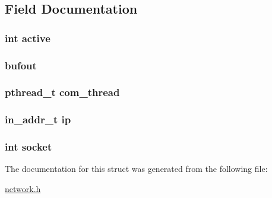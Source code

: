 \subsection{Field Documentation}
\hypertarget{structpeer_aa5805c5e936174e5092bf7a5b78e7e64}{
\subsubsection[{active}]{\setlength{\rightskip}{0pt plus 5cm}int active}}\label{structpeer_aa5805c5e936174e5092bf7a5b78e7e64}
\hypertarget{structpeer_a78b709e715ca837e65e67e5239799998}{
\subsubsection[{bufout}]{ bufout}}\label{structpeer_a78b709e715ca837e65e67e5239799998}
\hypertarget{structpeer_a9e2ccb9eb99322d3c6d4e025d1a46f53}{
\subsubsection[{com\-\_\-thread}]{\setlength{\rightskip}{0pt plus 5cm}pthread\-\_\-t com\-\_\-thread}}\label{structpeer_a9e2ccb9eb99322d3c6d4e025d1a46f53}
\hypertarget{structpeer_a576f19065d49f151479e4fd2df18670b}{
\subsubsection[{ip}]{\setlength{\rightskip}{0pt plus 5cm}in\-\_\-addr\-\_\-t ip}}\label{structpeer_a576f19065d49f151479e4fd2df18670b}
\hypertarget{structpeer_a3666576f6b88007cc7b8f26c7da596c8}{
\subsubsection[{socket}]{\setlength{\rightskip}{0pt plus 5cm}int socket}}\label{structpeer_a3666576f6b88007cc7b8f26c7da596c8}


The documentation for this struct was generated from the following file\-:\begin{DoxyCompactItemize}
\item 
\hyperlink{network_8h}{network.\-h}\end{DoxyCompactItemize}

